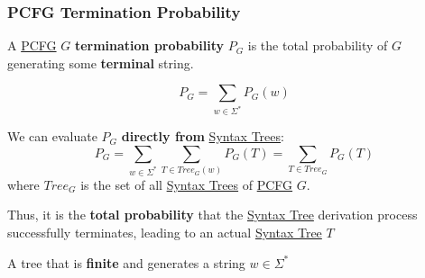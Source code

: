 \subsubsection{PCFG Termination Probability}\label{sub:lm_pcfg_termination_probability} %
A \hyperref[def:pcfg]{PCFG} $G$ \textbf{termination probability} $P_G$ is the total probability of $G$ generating some \textbf{terminal} string.
\begin{example}{}{}
    \[
        P_G = \sum_{w\in\Sigma^*}{P_G(w)}
    \]
\end{example}
We can evaluate $P_G$ \textbf{directly from} \hyperref[def:pg-syntax-tree]{Syntax Trees}:
\[
    P_G = \sum_{w\in\Sigma^*}\sum_{T\in Tree_G(w)}P_G(T) = \sum_{T\in Tree_G}P_G(T)
\]
where $Tree_G$ is the set of all \hyperref[def:pg-syntax-tree]{Syntax Trees} of \hyperref[def:pcfg]{PCFG} $G$.
\begin{note}
    Thus, it is the \textbf{total probability} that the \hyperref[def:pg-syntax-tree]{Syntax Tree} derivation process successfully terminates, leading to an actual \hyperref[def:pg-syntax-tree]{Syntax Tree} $T$
    \begin{warning}
        A tree that is \textbf{finite} and generates a string $w\in \Sigma^*$
    \end{warning}
\end{note}
%
